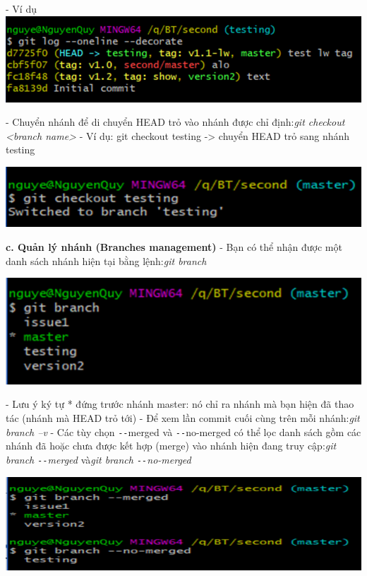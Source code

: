 \documentclass[12pt,a4paper]{report}
\begin{document}
	\label{fig:screenshot052}
\vskip 0.4cm\vskip 0.4cm
- Ví dụ
\vskip 0.4cm
	\includegraphics[width=0.8\linewidth]{screenshot053}
	
	\label{fig:screenshot053}
\vskip 0.4cm\vskip 0.4cm
- Chuyển nhánh để di chuyển HEAD trỏ vào nhánh được chỉ định:{\it git checkout <branch name>} \vskip 0.4cm
- Ví dụ: git checkout testing -> chuyển HEAD trỏ sang nhánh testing\vskip 0.4cm

	\includegraphics[width=0.8\linewidth]{screenshot054}

	\label{fig:screenshot054}
\vskip 0.4cm\vskip 0.4cm
{\bf c. Quản lý nhánh (Branches management)}\vskip 0.4cm
- Bạn có thể nhận được một danh sách nhánh hiện tại bằng lệnh:{\it git branch}\vskip 0.4cm

	\includegraphics[width=0.8\linewidth]{screenshot055}
	
	\label{fig:screenshot055}
\vskip 0.4cm\vskip 0.4cm
- Lưu ý ký tự * đứng trước nhánh master: nó chỉ ra nhánh mà bạn hiện đã thao tác (nhánh mà HEAD trỏ tới)\vskip 0.4cm
- Để xem lần commit cuối cùng trên mỗi nhánh:{\it git branch –v}\vskip 0.4cm
- Các tùy chọn \texttt{-{}-}merged và \texttt{-{}-}no-merged có thể lọc danh sách gồm các nhánh đã hoặc chưa được kết hợp (merge) vào nhánh hiện đang truy cập:{\it git branch \texttt{-{}-}merged} và{\it git branch \texttt{-{}-}no-merged}\vskip 0.4cm

	\includegraphics[width=0.8\linewidth]{screenshot056}
\end{document}
